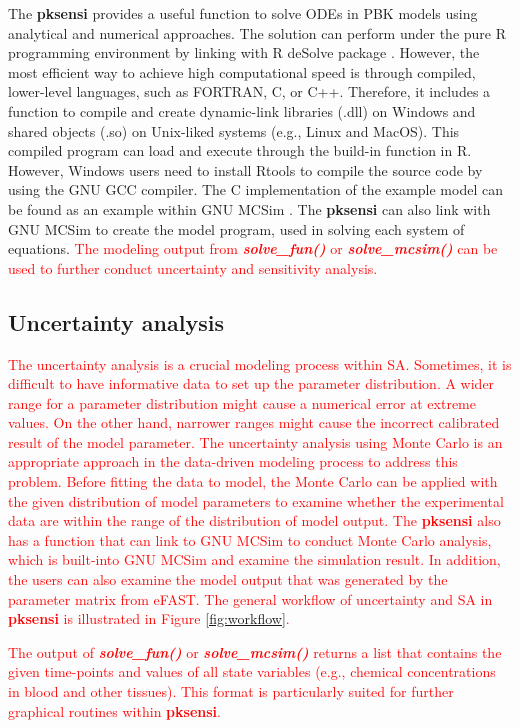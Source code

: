 \documentclass[preprint,12pt, a4paper]{elsarticle}
\begin{document}
The \textbf{pksensi} provides a useful function to solve ODEs in PBK models using analytical and numerical approaches. The solution can perform under the pure R programming environment by linking with R deSolve package \cite{JSSv033i09}. However, the most efficient way to achieve high computational speed is through compiled, lower-level languages, such as FORTRAN, C, or C++. Therefore, it includes a function to compile and create dynamic-link libraries (.dll) on Windows and shared objects (.so) on Unix-liked systems (e.g., Linux and MacOS). This compiled program can load and execute through the build-in function in R. However, Windows users need to install Rtools to compile the source code by using the GNU GCC compiler. The C implementation of the example model can be found as an example within GNU MCSim \cite{bois2009gnu}. The \textbf{pksensi} can also link with GNU MCSim to create the model program, used in solving each system of equations. \textcolor{red}{The modeling output from \textbf{\textit{solve\_fun()}} or \textbf{\textit{solve\_mcsim()}} can be used to further conduct uncertainty and sensitivity analysis.}


\subsection{Uncertainty analysis}

\textcolor{red}{The uncertainty analysis is a crucial modeling process within SA. Sometimes, it is difficult to have informative data to set up the parameter distribution. A wider range for a parameter distribution might cause a numerical error at extreme values. On the other hand, narrower ranges might cause the incorrect calibrated result of the model parameter. The uncertainty analysis using Monte Carlo is an appropriate approach in the data-driven modeling process to address this problem. Before fitting the data to model, the Monte Carlo can be applied with the given distribution of model parameters to examine whether the experimental data are within the range of the distribution of model output. The \textbf{pksensi} also has a function that can link to GNU MCSim to conduct Monte Carlo analysis, which is built-into GNU MCSim and examine the simulation result. In addition, the users can also examine the model output that was generated by the parameter matrix from eFAST. The general workflow of uncertainty and SA in \textbf{pksensi} is illustrated in Figure \ref{fig:workflow}.}

\textcolor{red}{The output of \textbf{\textit{solve\_fun()}} or \textbf{\textit{solve\_mcsim()}} returns a list that contains the given time-points and values of all state variables (e.g., chemical concentrations in blood and other tissues). This format is particularly suited for further graphical routines within \textbf{pksensi}.}
\end{document}
